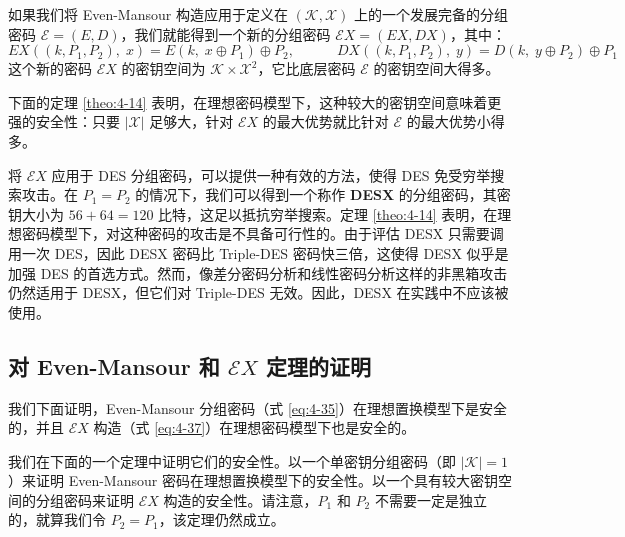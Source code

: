 \begin{snote}
如果我们将 Even-Mansour 构造应用于定义在 $(\mathcal{K},\mathcal{X})$ 上的一个发展完备的分组密码 $\mathcal{E}=(E,D)$，我们就能得到一个新的分组密码 $\mathcal{E}X=(EX,DX)$，其中：
\begin{equation}\label{eq:4-37}
EX((k,P_1,P_2),\;x)=E(k,\;x\oplus P_1)\oplus P_2,
\quad\quad\quad
DX((k,P_1,P_2),\;y)=D(k,\;y\oplus P_2)\oplus P_1
\end{equation}
这个新的密码 $\mathcal{E}X$ 的密钥空间为 $\mathcal{K}\times\mathcal{X}^2$，它比底层密码 $\mathcal{E}$ 的密钥空间大得多。

下面的定理 \ref{theo:4-14} 表明，在理想密码模型下，这种较大的密钥空间意味着更强的安全性：只要 $|\mathcal{X}|$ 足够大，针对 $\mathcal{E}X$ 的最大优势就比针对 $\mathcal{E}$ 的最大优势小得多。

将 $\mathcal{E}X$ 应用于 DES 分组密码，可以提供一种有效的方法，使得 DES 免受穷举搜索攻击。在 $P_1=P_2$ 的情况下，我们可以得到一个称作 \textbf{DESX} 的分组密码，其密钥大小为 $56+64=120$ 比特，这足以抵抗穷举搜索。定理 \ref{theo:4-14} 表明，在理想密码模型下，对这种密码的攻击是不具备可行性的。由于评估 DESX 只需要调用一次 DES，因此 DESX 密码比 Triple-DES 密码快三倍，这使得 DESX 似乎是加强 DES 的首选方式。然而，像差分密码分析和线性密码分析这样的非黑箱攻击仍然适用于 DESX，但它们对 Triple-DES 无效。因此，DESX 在实践中不应该被使用。
\end{snote}

\subsection{对 Even-Mansour 和 $\mathcal{E}X$ 定理的证明}\label{subsec:4-7-4}

我们下面证明，Even-Mansour 分组密码（式 \ref{eq:4-35}）在理想置换模型下是安全的，并且 $\mathcal{E}X$ 构造（式 \ref{eq:4-37}）在理想密码模型下也是安全的。

我们在下面的一个定理中证明它们的安全性。以一个单密钥分组密码（即 $|\mathcal{K}|=1$）来证明 Even-Mansour 密码在理想置换模型下的安全性。以一个具有较大密钥空间的分组密码来证明 $\mathcal{E}X$ 构造的安全性。请注意，$P_1$ 和 $P_2$ 不需要一定是独立的，就算我们令 $P_2=P_1$，该定理仍然成立。

